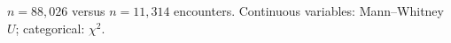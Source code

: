 {\footnotesize $n=88,026$ versus $n=11,314$ encounters. Continuous variables: Mann--Whitney $U$; categorical: $\chi^2$.}
